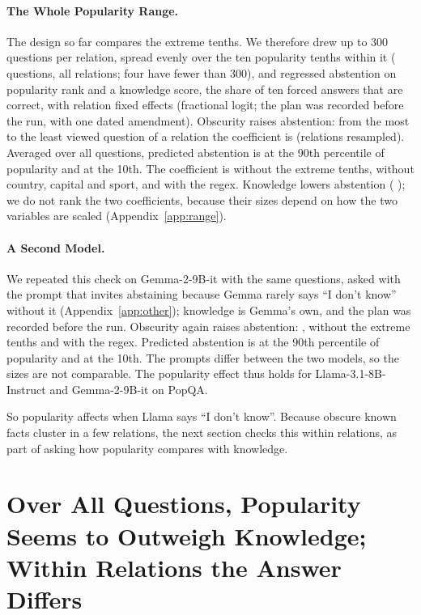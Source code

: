\documentclass[11pt]{article}
\newcommand{\idk}{``I don't know''}
\begin{document}
\paragraph{The Whole Popularity Range.} The design so far compares the extreme tenths. We therefore drew up to 300 questions per relation, spread evenly over the ten popularity tenths within it (\xtAllN{} questions, all \xtRel{} relations; four have fewer than 300), and regressed abstention on popularity rank and a knowledge score, the share of ten forced answers that are correct, with relation fixed effects (fractional logit; the plan was recorded before the run, with one dated amendment). Obscurity raises abstention: from the most to the least viewed question of a relation the coefficient is \xtAll{} \xtAllCI{} (relations resampled). Averaged over all questions, predicted abstention is \xtPredPop{} at the 90th percentile of popularity and \xtPredObs{} at the 10th. The coefficient is \xtMid{} \xtMidCI{} without the extreme tenths, \xtNoThree{} \xtNoThreeCI{} without country, capital and sport, and \xtAllRegex{} \xtAllRegexCI{} with the regex. Knowledge lowers abstention (\xtKnow{} \xtKnowCI); we do not rank the two coefficients, because their sizes depend on how the two variables are scaled (Appendix~\ref{app:range}).

\paragraph{A Second Model.} We repeated this check on Gemma-2-9B-it with the same questions, asked with the prompt that invites abstaining because Gemma rarely says \idk{} without it (Appendix~\ref{app:other}); knowledge is Gemma's own, and the plan was recorded before the run. Obscurity again raises abstention: \gxAll{} \gxAllCI, \gxMid{} \gxMidCI{} without the extreme tenths and \gxAllRegex{} \gxAllRegexCI{} with the regex. Predicted abstention is \gxPredPop{} at the 90th percentile of popularity and \gxPredObs{} at the 10th. The prompts differ between the two models, so the sizes are not comparable. The popularity effect thus holds for Llama-3.1-8B-Instruct and Gemma-2-9B-it on PopQA.

So popularity affects when Llama says \idk. Because obscure known facts cluster in a few relations, the next section checks this within relations, as part of asking how popularity compares with knowledge.

\section{Over All Questions, Popularity Seems to Outweigh Knowledge; Within Relations the Answer Differs}
\label{sec:relations}
\end{document}
